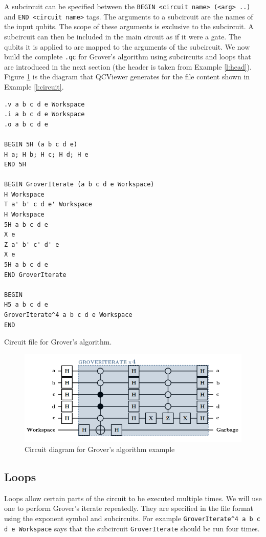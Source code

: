 \documentclass[aps,prl,reprint,floatfix,superscriptaddress]{revtex4-1} %
\begin{document}
A subcircuit can be specified between the \verb+BEGIN <circuit name> (<arg> ..)+ and \verb+END <circuit name>+ tags.
The arguments to a subcircuit are the names of the input qubits.
The scope of these arguments is exclusive to the subcircuit.
A subcircuit can then be included in the main circuit as if it were a gate.
The qubits it is applied to are mapped to the arguments of the subcircuit. 
We now build the complete \verb+.qc+ for Grover's algorithm using subcircuits and loops that are introduced in the next section (the header is taken from Example \ref{l:head}).
Figure \ref{f:grover} is the diagram that QCViewer generates for the file content shown in Example \ref{l:circuit}.
\begin{program}
\begin{verbatim}
.v a b c d e Workspace
.i a b c d e Workspace
.o a b c d e

BEGIN 5H (a b c d e)
H a; H b; H c; H d; H e
END 5H

BEGIN GroverIterate (a b c d e Workspace)
H Workspace
T a' b' c d e' Workspace
H Workspace
5H a b c d e
X e
Z a' b' c' d' e
X e
5H a b c d e
END GroverIterate

BEGIN
H5 a b c d e
GroverIterate^4 a b c d e Workspace
END
\end{verbatim}
\caption{Circuit file for Grover's algorithm.}
\label{l:circuit}
\end{program}
\begin{figure}[ht]
\includegraphics[scale=0.32]{grover_circuit}
\caption{Circuit diagram for Grover's algorithm example}
\label{f:grover}
\end{figure}
\subsection{Loops}
Loops allow certain parts of the circuit to be executed multiple times. 
We will use one to perform Grover's iterate repeatedly. 
They are specified in the file format using the exponent symbol and subcircuits.
For example \verb+GroverIterate^4 a b c d e Workspace+ says that the subcircuit \verb+GroverIterate+ should be run four times.
\end{document}
